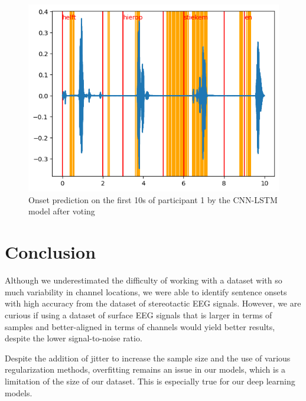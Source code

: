 \documentclass[format=sigconf, nonacm=true, review=false, screen=true]{acmart}
\begin{document}
\begin{figure} [H]
    \centering
    \includegraphics[width=\columnwidth]{figures/cnn-lstm_online.png}
    \caption{Onset prediction on the first 10s of participant 1 by the CNN-LSTM model after voting}
    \label{fig:cnn-lstm_online}
\end{figure}

\section{Conclusion}

Although we underestimated the difficulty of working with a dataset with so much variability in channel locations, we were able to identify sentence onsets with high accuracy from the dataset of stereotactic EEG signals. However, we are curious if using a dataset of surface EEG signals that is larger in terms of samples and better-aligned in terms of channels would yield better results, despite the lower signal-to-noise ratio.

Despite the addition of jitter to increase the sample size and the use of various regularization methods, overfitting remains an issue in our models, which is a limitation of the size of our dataset. This is especially true for our deep learning models.
\end{document}

